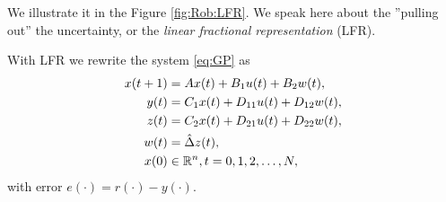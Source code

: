 We illustrate it in the Figure \ref{fig:Rob:LFR}. 
We speak here about the ''pulling out'' the uncertainty, or the \textit{linear fractional representation} (LFR). 


With LFR we rewrite the system \eqref{eq:GP} as 
\begin{align}
\label{eq:uncABCD}
\begin{split}
x(t+1) &= A x(t) + B_1 u(t) + B_2 w(t), \\
y(t)   &= C_1x(t) + D_{11} u(t) + D_{12} w(t), \\
z(t)   &= C_2x(t) + D_{21} u(t) + D_{22}w(t),\\
w(t) &= \hat{\Delta} z(t),\\
x(0)& \in {\mathbb{R}}^{n}, t = 0,1,2, \dots, N, 
\end{split}
\end{align}
with error $e(\cdot) = r(\cdot) - y(\cdot)$. 


